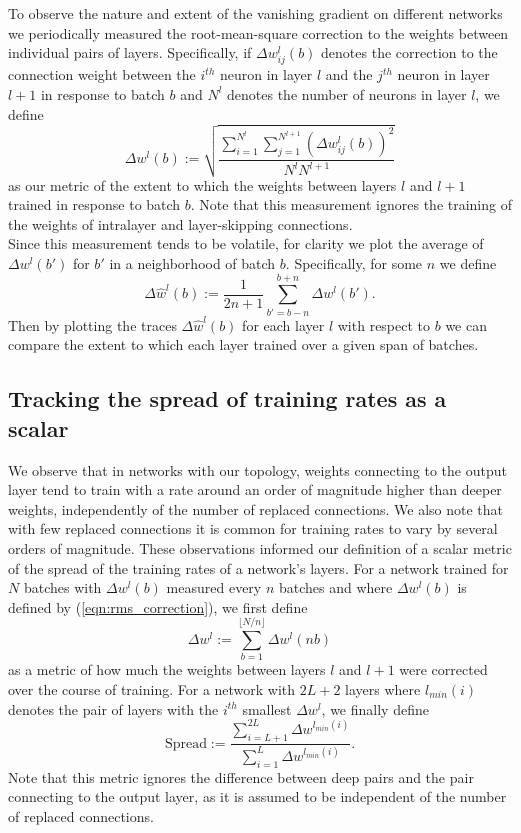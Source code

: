 \documentclass{article}
\newcommand{\npar}{\\\indent}
\begin{document}
To observe the nature and extent of the vanishing gradient on different networks we periodically measured the root-mean-square correction to the weights between individual pairs of layers. Specifically, if $\Delta w_{ij}^l(b)$ denotes the correction to the connection weight between the $i^{th}$ neuron in layer $l$ and the $j^{th}$ neuron in layer $l+1$ in response to batch $b$ and $N^l$ denotes the number of neurons in layer $l$, we define
\begin{equation}
\label{eqn:rms_correction}
\Delta w^l(b):=\sqrt{\frac{\sum_{i=1}^{N^l}\sum_{j=1}^{N^{l+1}}(\Delta w_{ij}^l(b))^2}{N^lN^{l+1}}}
\end{equation}
as our metric of the extent to which the weights between layers $l$ and $l+1$ trained in response to batch $b$. Note that this measurement ignores the training of the weights of intralayer and layer-skipping connections.
\npar
Since this measurement tends to be volatile, for clarity we plot the average of $\Delta w^l(b')$ for $b'$ in a neighborhood of batch $b$. Specifically, for some $n$ we define
\begin{equation}
\label{eqn:running_avg}
\Delta \hat{w}^l(b):=\frac{1}{2n+1}\sum_{b'=b-n}^{b+n}\Delta w^l(b').
\end{equation}
Then by plotting the traces $\Delta \hat{w}^l(b)$ for each layer $l$ with respect to $b$ we can compare the extent to which each layer trained over a given span of batches.

\subsection{Tracking the spread of training rates as a scalar}

We observe that in networks with our topology, weights connecting to the output layer tend to train with a rate around an order of magnitude higher than deeper weights, independently of the number of replaced connections. We also note that with few replaced connections it is common for training rates to vary by several orders of magnitude. These observations informed our definition of a scalar metric of the spread of the training rates of a network's layers. For a network trained for $N$ batches with $\Delta w^l(b)$ measured every $n$ batches and where $\Delta w^l(b)$ is defined by (\ref{eqn:rms_correction}), we first define 
\begin{equation}
\label{eqn:training_sum}
\Delta w^l:=\sum_{b=1}^{\lfloor N/n\rfloor}\Delta w^l(nb)
\end{equation}
as a metric of how much the weights between layers $l$ and $l+1$ were corrected over the course of training. For a network with $2L+2$ layers where $l_{min}(i)$ denotes the pair of layers with the $i^{th}$ smallest $\Delta w^l$, we finally define 
\begin{equation}
\label{eqn:spread}
\text{Spread}:=\frac{\sum_{i=L+1}^{2L}\Delta w^{l_{min}(i)}}{\sum_{i=1}^L\Delta w^{l_{min}(i)}}.
\end{equation}
Note that this metric ignores the difference between deep pairs and the pair connecting to the output layer, as it is assumed to be independent of the number of replaced connections. 
\end{document}
